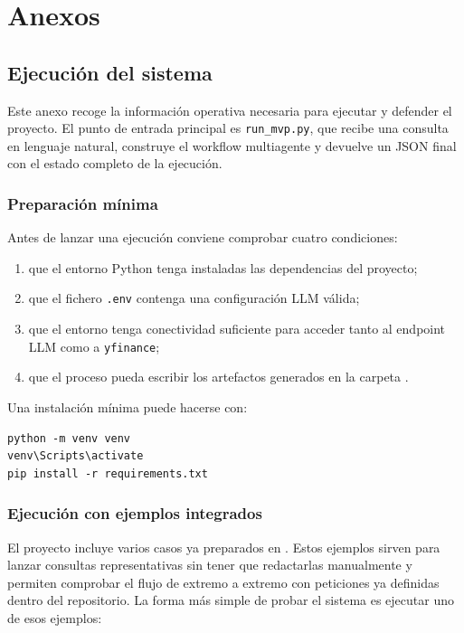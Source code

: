\chapter{Anexos}

\section{Ejecuci\'on del sistema}

Este anexo recoge la informaci\'on operativa necesaria para ejecutar y defender el proyecto. El punto de entrada principal es \texttt{run\_mvp.py}, que recibe una consulta en lenguaje natural, construye el workflow multiagente y devuelve un JSON final con el estado completo de la ejecuci\'on.

\subsection{Preparaci\'on m\'inima}

Antes de lanzar una ejecuci\'on conviene comprobar cuatro condiciones:

\begin{enumerate}
    \item que el entorno Python tenga instaladas las dependencias del proyecto;
    \item que el fichero \texttt{.env} contenga una configuraci\'on LLM v\'alida;
    \item que el entorno tenga conectividad suficiente para acceder tanto al endpoint LLM como a \texttt{yfinance};
    \item que el proceso pueda escribir los artefactos generados en la carpeta .
\end{enumerate}

Una instalaci\'on m\'inima puede hacerse con:

\begin{verbatim}
python -m venv venv
venv\Scripts\activate
pip install -r requirements.txt
\end{verbatim}

\subsection{Ejecuci\'on con ejemplos integrados}

El proyecto incluye varios casos ya preparados en . Estos ejemplos sirven para lanzar consultas representativas sin tener que redactarlas manualmente y permiten comprobar el flujo de extremo a extremo con peticiones ya definidas dentro del repositorio. La forma m\'as simple de probar el sistema es ejecutar uno de esos ejemplos:

